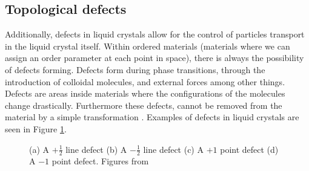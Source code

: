 \documentclass[preprint, aps]{revtex4-1}
\begin{document}
\subsection*{Topological defects}
Additionally, defects in liquid crystals allow for the control of particles 
transport in the liquid crystal itself. Within ordered materials (materials 
where we can assign an order parameter at each point in space), there is always 
the possibility of defects forming. Defects form during phase transitions,
through the introduction of colloidal molecules, and external forces among other 
things. Defects are areas inside materials where the configurations of the 
molecules change drastically. Furthermore these defects, cannot be removed from 
the material by a simple transformation \cite{mermin79}. Examples of defects in 
liquid crystals are seen in Figure \ref{fig:defects}.
	\begin{figure}[H]
		\centering

		\caption{(a) A $+\frac{1}{2}$ line defect (b) A $-\frac{1}{2}$ line
		defect (c) A $+1$ point defect (d) A $-1$ point defect. Figures from
		\cite{chuang91}}
		\label{fig:defects}
	\end{figure}
\end{document}
